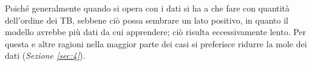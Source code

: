\documentclass{subfiles}
\begin{document}
Poiché generalmente quando si opera con i dati si ha a che fare con quantità dell'ordine dei TB, sebbene ciò possa sembrare un lato positivo,
in quanto il modello avrebbe più dati da cui apprendere; ciò risulta eccessivamente lento.
Per questa e altre ragioni nella maggior parte dei casi si preferisce ridurre la mole dei dati (\emph{Sezione \ref{sec:4}}).
\end{document}
